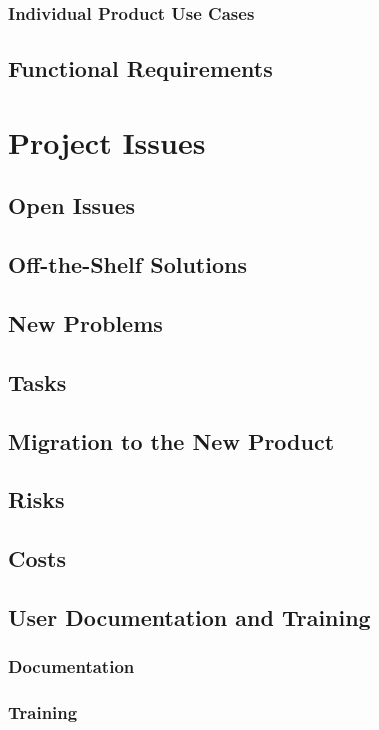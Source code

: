 \documentclass{article}
\begin{document}
\subsubsection{Individual Product Use Cases}

\subsection{Functional Requirements}



\section{Project Issues}
\subsection{Open Issues}
\subsection{Off-the-Shelf Solutions}
\subsection{New Problems}
\subsection{Tasks}
\subsection{Migration to the New Product}
\subsection{Risks}
\subsection{Costs}
\subsection{User Documentation and Training}
\subsubsection{Documentation}
\subsubsection{Training}
\end{document}
